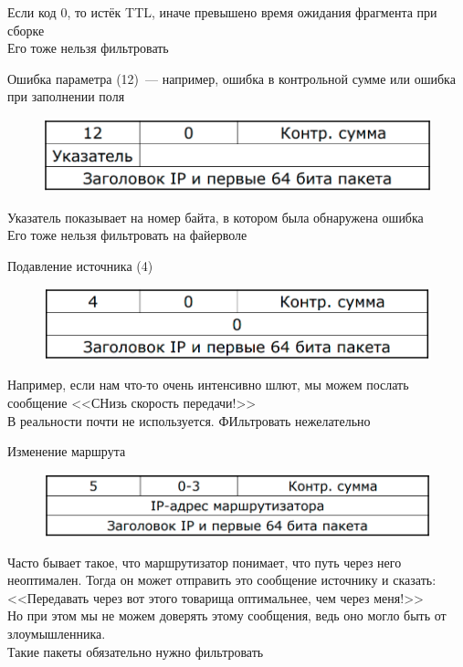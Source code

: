 \begin{MyItemize}
\begin{figure}[H]
    \end{figure}
    Если код 0, то истёк TTL, иначе превышено время ожидания фрагмента при сборке\\
    Его тоже нельзя фильтровать
    \item Ошибка параметра (12)~--- например, ошибка в контрольной сумме или ошибка при заполнении поля\\
    \begin{figure}[H]
        \centering
        \includegraphics[width=15cm]{images/02/12}
    \end{figure}
    Указатель показывает на номер байта, в котором была обнаружена ошибка\\
    Его тоже нельзя фильтровать на файерволе
\end{MyItemize}



\begin{MyItemize}
    \item Подавление источника (4)\\
    \begin{figure}[H]
        \centering
        \includegraphics[width=15cm]{images/02/13}
    \end{figure}
    Например, если нам что-то очень интенсивно шлют, мы можем послать сообщение <<СНизь скорость передачи!>>\\
    В реальности почти не используется. ФИльтровать нежелательно
    \item Изменение маршрута\\
    \begin{figure}[H]
        \centering
        \includegraphics[width=15cm]{images/02/14}
    \end{figure}
    Часто бывает такое, что маршрутизатор понимает, что путь через него неоптимален. Тогда он может отправить это сообщение источнику и сказать: <<Передавать через вот этого товарища оптимальнее, чем через меня!>>\\
    Но при этом мы не можем доверять этому сообщения, ведь оно могло быть от злоумышленника.\\
    Такие пакеты обязательно нужно фильтровать
\end{MyItemize}

